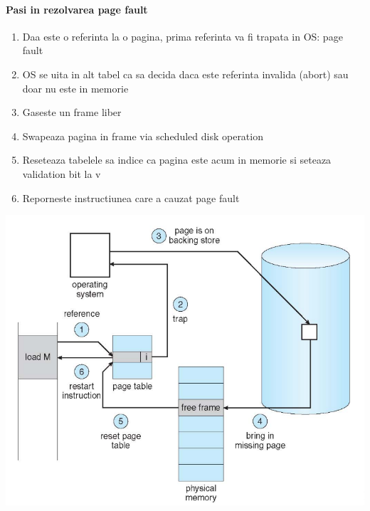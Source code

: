 \documentclass{article}
\begin{document}
\paragraph*{Pasi in rezolvarea page fault}
\begin{enumerate}
    \item Daa este o referinta la o pagina, prima referinta va fi trapata in OS: page fault
    \item OS se uita in alt tabel ca sa decida daca este referinta invalida (abort) sau doar nu este in memorie
    \item Gaseste un frame liber
    \item Swapeaza pagina in frame via scheduled disk operation
    \item Reseteaza tabelele sa indice ca pagina este acum in memorie si seteaza validation bit la v
    \item Reporneste instructiunea care a cauzat page fault
\end{enumerate}
\begin{center}
    \includegraphics[scale=0.3]{32-pagefault.png}
\end{center}
\end{document}
